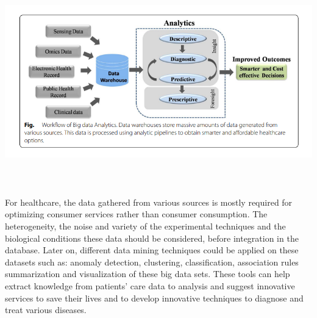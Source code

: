 \documentclass[10pt,a4paper,twoside]{article}
\begin{document}
\begin{center}
    \includegraphics[width=16cm, height=9cm]{analytics} \\[\baselineskip]
\end{center}

For healthcare, the data gathered from various sources is mostly required for optimizing consumer services rather than consumer consumption. The heterogeneity, the noise and variety of the experimental techniques and the biological conditions these data should be considered, before integration in the database. Later on, different data mining techniques could be applied on these datasets such as: anomaly detection, clustering, classification, association rules summarization and visualization of these big data sets. These tools can help extract knowledge from patients’ care data to analysis and suggest innovative services to save their lives and to develop innovative techniques to diagnose and treat various diseases.
\\[\baselineskip]
\end{document}
